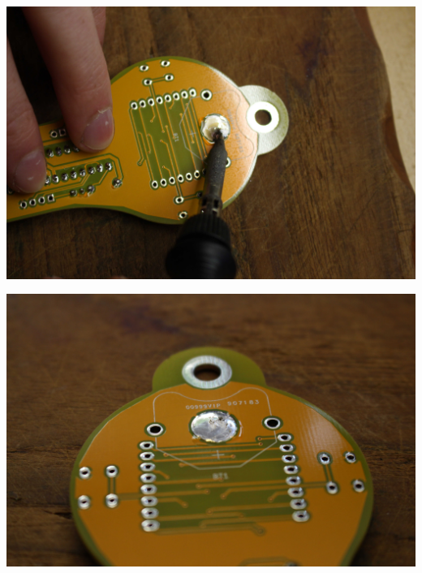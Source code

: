 \documentclass{article}
\begin{document}
\begin{minipage}[b]{0.5\textwidth}
	\includegraphics[width=\textwidth]{Bilder/IMG_5563.JPG}
	\label{fig:}
\end{minipage}
\begin{minipage}[b]{0.5\textwidth}
	\includegraphics[width=\textwidth]{Bilder/IMG_5564.JPG}
	\label{fig:}
\end{minipage}
\end{document}
